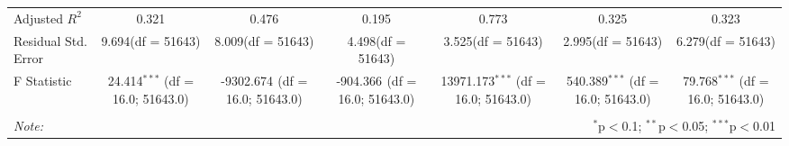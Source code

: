 \begin{table}[!htbp]
\begin{tabular}{@{\extracolsep{5pt}}lcccccc}
 Adjusted $R^2$ & 0.321 & 0.476 & 0.195 & 0.773 & 0.325 & 0.323 \\
 Residual Std. Error & 9.694(df = 51643) & 8.009(df = 51643) & 4.498(df = 51643) & 3.525(df = 51643) & 2.995(df = 51643) & 6.279(df = 51643)  \\
 F Statistic & 24.414$^{***}$ (df = 16.0; 51643.0) & -9302.674$^{}$ (df = 16.0; 51643.0) & -904.366$^{}$ (df = 16.0; 51643.0) & 13971.173$^{***}$ (df = 16.0; 51643.0) & 540.389$^{***}$ (df = 16.0; 51643.0) & 79.768$^{***}$ (df = 16.0; 51643.0) \\
\hline
\hline \\[-1.8ex]
\textit{Note:} & \multicolumn{6}{r}{$^{*}$p$<$0.1; $^{**}$p$<$0.05; $^{***}$p$<$0.01} \\
\end{tabular}
\end{table}